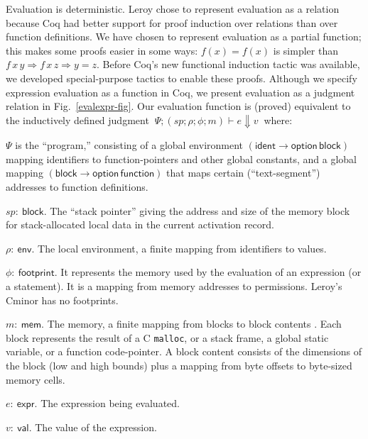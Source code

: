 \documentclass{llncs}
\newcommand{\cminor}{Cminor}
\newcommand{\tyface}[1]{\ensuremath{\mathsf{#1}}}
\newcommand{\option}{\tyface{option}}
\newcommand{\val}{\tyface{val}}
\newcommand{\expr}{\tyface{expr}}
\newcommand{\env}{\tyface{env}}
\newcommand{\mem}{\tyface{mem}}
\newcommand{\fmap}{\Psi}
\newcommand{\evalexpr}[7]{#1;(#2;#3;#4;#5) \vdash #6 \Downarrow #7}
\begin{document}
Evaluation is deterministic.
Leroy chose to represent evaluation as a relation because 
Coq had better
support for proof induction over relations than over function definitions.
We have chosen to represent
evaluation as a partial function; this makes some proofs easier
in some ways: $f(x)=f(x)$ is simpler than $f\,x\,y\Rightarrow f\,x\,z
\Rightarrow y=z$.
Before Coq's new functional induction tactic was available, 
we developed special-purpose tactics to enable these proofs.
Although we specify expression evaluation as a function in Coq,
we present evaluation as a judgment relation in Fig.~\ref{evalexpr-fig}.
Our evaluation function is
(proved) equivalent to the inductively defined 
judgment $~\evalexpr{\fmap}{\mathit{sp}}{\rho}{\phi}{m}{e}{v}~$
where:
\begin{description}
\vspace{-7pt}
\item{$\fmap$} is the ``program,'' consisting of a global environment
$(\tyface{ident}\rightarrow \option\,\tyface{block})$
mapping identifiers to function-pointers and other global constants,
and a global mapping $(\tyface{block}\rightarrow \option\,\tyface{function})$
that maps certain (``text-segment'') addresses to function definitions.
\item{$\mathit{sp}:~\tyface{block}.$}
The ``stack pointer'' giving the address and size of the memory block for 
stack-allocated local data in the current activation record.
\item{$\rho:~\env{}.$}
The local environment, a finite mapping
from identifiers to values.
\item{$\phi:~\tyface{footprint}.$}
It represents the memory used by the evaluation of an expression (or a statement).
It is a mapping from  memory addresses to permissions.  Leroy's \cminor{} has no 
footprints.
\item{$m:~\mem.$}
The memory, a finite mapping from blocks
to block contents \cite{blazy05:icfem}.  
Each block represents
the result of a C \texttt{malloc},
or a stack frame, a global static variable, or a function
code-pointer. 
A block content consists of the dimensions of the block (low and high bounds) 
plus a mapping from byte offsets to byte-sized memory cells.
\item{$e:~\expr.$}
The expression being evaluated. 
\item{$v:~\val.$} The value of the expression.
\end{description}
\end{document}
